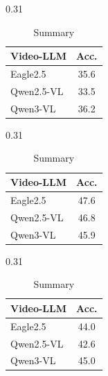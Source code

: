 \documentclass[runningheads]{llncs}
\begin{document}
{        \begin{table}[h]
            \centering
            \vspace{-4mm}
            \footnotesize 
            \setlength{\tabcolsep}{5pt} 
            \begin{subtable}[t]{0.31\textwidth}
                \centering
                \begin{tabular}{lc}
                    \toprule
                    \rowcolor[gray]{0.9} \textbf{Video-LLM} & \textbf{Acc.} \\
                    \midrule
                    Eagle2.5 & 35.6 \\
                    Qwen2.5-VL & 33.5 \\
                    Qwen3-VL & 36.2 \\
                    \bottomrule
                \end{tabular}
                \caption{Blind Test}
            \end{subtable}
            \hfill
            \begin{subtable}[t]{0.31\textwidth}
                \centering
                \begin{tabular}{lc}
                    \toprule
                    \rowcolor[gray]{0.9} \textbf{Video-LLM} & \textbf{Acc.} \\
                    \midrule
                    Eagle2.5 & 47.6 \\
                    Qwen2.5-VL & 46.8 \\
                    Qwen3-VL & 45.9 \\
                    \bottomrule
                \end{tabular}
                \caption{Audio}
            \end{subtable}
            \hfill
            \begin{subtable}[t]{0.31\textwidth}
                \centering
                \begin{tabular}{lc}
                    \toprule
                    \rowcolor[gray]{0.9} \textbf{Video-LLM} & \textbf{Acc.} \\
                    \midrule
                    Eagle2.5 & 44.0 \\
                    Qwen2.5-VL & 42.6 \\
                    Qwen3-VL & 45.0 \\
                    \bottomrule
                \end{tabular}
                \caption{Summary}
            \end{subtable}
        

\end{table}}
\end{document}

